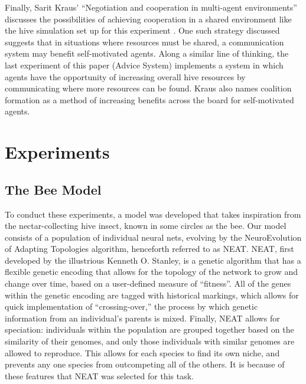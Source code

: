 \documentclass[11pt]{article}
\begin{document}
		Finally, Sarit Kraus' ``Negotiation and cooperation in multi-agent environments'' discusses the possibilities of achieving cooperation in a shared environment like the hive simulation set up for this experiment \cite{kraus}. One such strategy discussed suggests that in situations where resources must be shared, a communication system may benefit self-motivated agents. Along a similar line of thinking, the last experiment of this paper (Advice System) implements a system in which agents have the opportunity of increasing overall hive resources by communicating where more resources can be found. Kraus also names coalition formation as a method of increasing benefits across the board for self-motivated agents. 



	\section{Experiments} %
	\label{sec:experiments}

		\subsection{The Bee Model} %
		\label{sub:the_bee_model}
			To conduct these experiments, a model was developed that takes inspiration from the nectar-collecting hive insect, known in some circles as the bee. Our model consists of a population of individual neural nets, evolving by the NeuroEvolution of Adapting Topologies algorithm, henceforth referred to as NEAT.\cite{neat} NEAT, first developed by the illustrious Kenneth O. Stanley, is a genetic algorithm that has a flexible genetic encoding that allows for the topology of the network to grow and change over time, based on a user-defined measure of ``fitness''. All of the genes within the genetic encoding are tagged with historical markings, which allows for quick implementation of ``crossing-over,'' the process by which genetic information from an individual's parents is mixed. Finally, NEAT allows for speciation: individuals within the population are grouped together based on the similarity of their genomes, and only those individuals with similar genomes are allowed to reproduce. This allows for each species to find its own niche, and prevents any one species from outcompeting all of the others. It is because of these features that NEAT was selected for this task.
\end{document}
